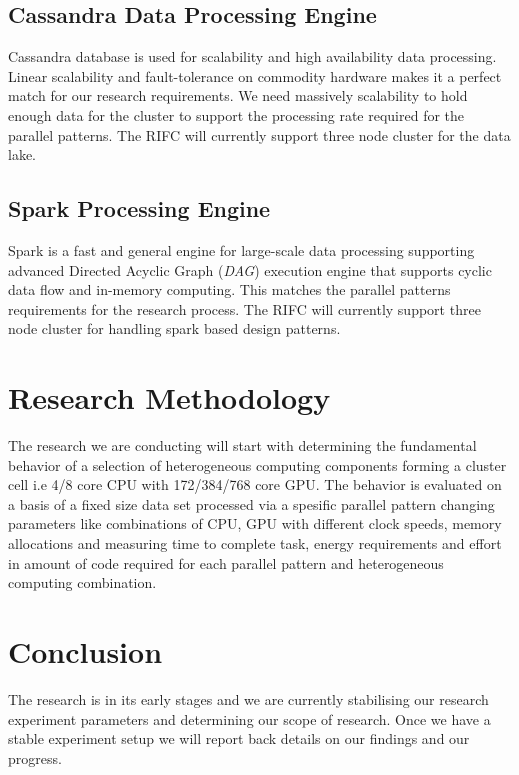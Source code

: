 \documentclass{acm_proc_article-sp}
\begin{document}
\subsection{Cassandra Data Processing Engine}
Cassandra database is used for scalability and high availability data processing. Linear scalability and fault-tolerance on commodity hardware makes it a perfect match for our research requirements. We need massively scalability to hold enough data for the cluster to support the processing rate required for the parallel patterns. The RIFC will currently support three node cluster for the data lake.
\subsection{Spark Processing Engine}
Spark is a fast and general engine for large-scale data processing supporting advanced Directed Acyclic Graph (\textit{DAG}) execution engine that supports cyclic data flow and in-memory computing. This matches the parallel patterns requirements for the research process. The RIFC will currently support three node cluster for handling spark based design patterns. 
\section{Research Methodology}
The research we are conducting will start with determining the fundamental behavior of a selection of heterogeneous computing components forming a cluster cell i.e 4/8 core CPU with 172/384/768 core GPU. The behavior is evaluated on a basis of a fixed size data set processed via a spesific parallel pattern changing parameters like combinations of CPU, GPU with different clock speeds, memory allocations and measuring time to complete task, energy requirements and effort in amount of code required for each parallel pattern and heterogeneous computing combination. 
\section{Conclusion}
The research is in its early stages and we are currently stabilising our research experiment parameters and determining our scope of research. Once we have a stable experiment setup we will report back details on our findings and our progress.
\end{document}
